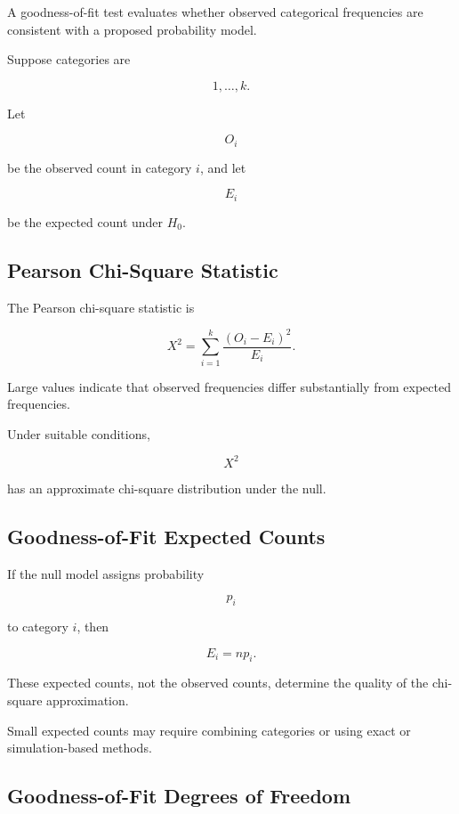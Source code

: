 A goodness-of-fit test evaluates whether observed categorical frequencies
are consistent with a proposed probability model.

Suppose categories are

\[
1,\ldots,k.
\]

Let

\[
O_i
\]

be the observed count in category \(i\), and let

\[
E_i
\]

be the expected count under \(H_0\).

\subsection{Pearson Chi-Square Statistic}
\label{subsec:pearson-chi-square-statistic}

The Pearson chi-square statistic is

\[
\boxed{
X^2
=
\sum_{i=1}^{k}
\frac{
(O_i-E_i)^2
}{
E_i
}.
}
\]

Large values indicate that observed frequencies differ substantially
from expected frequencies.

Under suitable conditions,

\[
X^2
\]

has an approximate chi-square distribution under the null.

\subsection{Goodness-of-Fit Expected Counts}
\label{subsec:gof-expected-counts}

If the null model assigns probability

\[
p_i
\]

to category \(i\), then

\[
\boxed{
E_i
=
np_i.
}
\]

These expected counts, not the observed counts, determine the quality of
the chi-square approximation.

Small expected counts may require combining categories or using exact or
simulation-based methods.

\subsection{Goodness-of-Fit Degrees of Freedom}
\label{subsec:gof-df}

